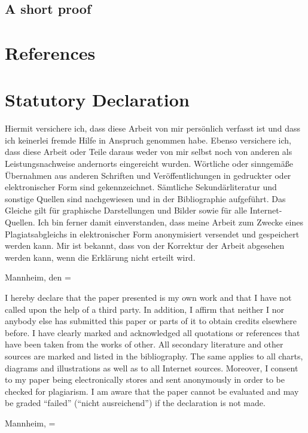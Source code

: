 \documentclass[12pt,english,a4paper,oneside]{article}
\newlength{\cslhangindent}
\newlength{\cslentryspacingunit} %
\newenvironment{CSLReferences}[2] %
 {%
  \setlength{\parindent}{0pt}
  \ifodd #1
  \let\oldpar\par
  \def\par{\hangindent=\cslhangindent\oldpar}
  \fi
  \setlength{\parskip}{#2\cslentryspacingunit}
 }%
 {}
\newcommand*{\SignatureAndDate}[1]{%
\vspace{2cm}
     Mannheim, den \makebox[2cm]{\hrulefill} \hfill\makebox[9cm]{\hrulefill}%
     \par
  \hfill\makebox[7.5cm][t]{Name und Unterschrift}
  \vspace{2cm}
}%
\newcommand*{\SignatureAndDateEng}[1]{%
\vspace{2cm}
     Mannheim, \makebox[2cm]{\hrulefill} \hfill\makebox[9cm]{\hrulefill}%
     \par
    \hfill\makebox[7.5cm][t]{Name and Signature}%
\vspace{2cm}
}%
\theoremstyle{definition}
\theoremstyle{definition}
\theoremstyle{definition}
\theoremstyle{definition}
\theoremstyle{remark}
\begin{document}
\hypertarget{a-short-proof}{%
\subsection{A short proof}\label{a-short-proof}}

\newpage

\hypertarget{references}{%
\section*{References}\label{references}}

\singlespacing

\hypertarget{refs}{}
\begin{CSLReferences}{0}{0}
\end{CSLReferences}

\clearpage

\hypertarget{statutory-declaration}{%
\section*{Statutory Declaration}\label{statutory-declaration}}

Hiermit versichere ich, dass diese Arbeit von mir persönlich verfasst ist und dass ich keinerlei fremde Hilfe in Anspruch genommen habe.
Ebenso versichere ich, dass diese Arbeit oder Teile daraus weder von mir selbst noch von anderen als Leistungsnachweise andernorts eingereicht wurden.
Wörtliche oder sinngemäße Übernahmen aus anderen Schriften und Veröffentlichungen in gedruckter oder elektronischer Form sind gekennzeichnet.
Sämtliche Sekundärliteratur und sonstige Quellen sind nachgewiesen und in der Bibliographie aufgeführt.
Das Gleiche gilt für graphische Darstellungen und Bilder sowie für alle Internet-Quellen.
Ich bin ferner damit einverstanden, dass meine Arbeit zum Zwecke eines Plagiatsabgleichs in elektronischer Form anonymisiert versendet und gespeichert werden kann.
Mir ist bekannt, dass von der Korrektur der Arbeit abgesehen werden kann, wenn die Erklärung nicht erteilt wird.

\SignatureAndDate{}
\renewcommand*{\thepage}{ }

\noindent I hereby declare that the paper presented is my own work and that I have not called upon the help of a third party.
In addition, I affirm that neither I nor anybody else has submitted this paper or parts of it to obtain credits elsewhere before.
I have clearly marked and acknowledged all quotations or references that have been taken from the works of other.
All secondary literature and other sources are marked and listed in the bibliography.
The same applies to all charts, diagrams and illustrations as well as to all Internet sources.
Moreover, I consent to my paper being electronically stores and sent anonymously in order to be checked for plagiarism.
I am aware that the paper cannot be evaluated and may be graded \enquote{failed} (\enquote{nicht ausreichend}) if the declaration is not made.

\SignatureAndDateEng{}

\end{document}
